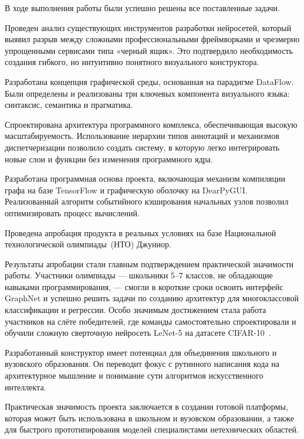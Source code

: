 \documentclass{report}
\begin{document}
В ходе выполнения работы были успешно решены все поставленные задачи.

\begin{enumarabic}
\item Проведен анализ существующих инструментов разработки нейросетей, который выявил разрыв между сложными профессиональными фреймворками и чрезмерно упрощенными сервисами типа «черный ящик». Это подтвердило необходимость создания гибкого, но интуитивно понятного визуального конструктора.
\item Разработана концепция графической среды, основанная на парадигме DataFlow. Были определены и реализованы три ключевых компонента визуального языка: синтаксис, семантика и прагматика.
\item Спроектирована архитектура программного комплекса, обеспечивающая высокую масштабируемость. Использование иерархии типов аннотаций и механизмов диспетчеризации позволило создать систему, в которую легко интегрировать новые слои и функции без изменения программного ядра.
\item Разработана программная основа проекта, включающая механизм компиляции графа на базе TensorFlow и графическую оболочку на DearPyGUI. Реализованный алгоритм событийного кэширования начальных узлов позволил оптимизировать процесс вычислений.
\item Проведена апробация продукта в реальных условиях на базе Национальной технологической олимпиады~(НТО) Джуниор.
\end{enumarabic}

Результаты апробации стали главным подтверждением практической значимости работы. Участники олимпиады — школьники 5–7 классов, не обладающие навыками программирования, — смогли в короткие сроки освоить интерфейс GraphNet и успешно решить задачи по созданию архитектур для многоклассовой классификации и регрессии. Особо значимым достижением стала работа участников на слёте победителей, где команды самостоятельно спроектировали и обучили сложную сверточную нейросеть LeNet-5 на датасете CIFAR-10~\cite{bib_cifar_10}.

Разработанный конструктор имеет потенциал для объединения школьного и вузовского образования. Он переводит фокус с рутинного написания кода на архитектурное мышление и понимание сути алгоритмов искусственного интеллекта.

Практическая значимость проекта заключается в создании готовой платформы, которая может быть использована в школьном и вузовском образовании, а также для быстрого прототипирования моделей специалистами нетехнических областей.
\end{document}
